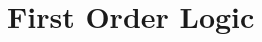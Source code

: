 \documentclass[12pt,
    driverfallback=dvipdfm,
 	openany,
    a4paper,
    toc=bibliography,
    twoside,
    numbers=noenddot]{book}              %
\begin{document}
\part{First Order Logic}





\printindex



\end{document}
